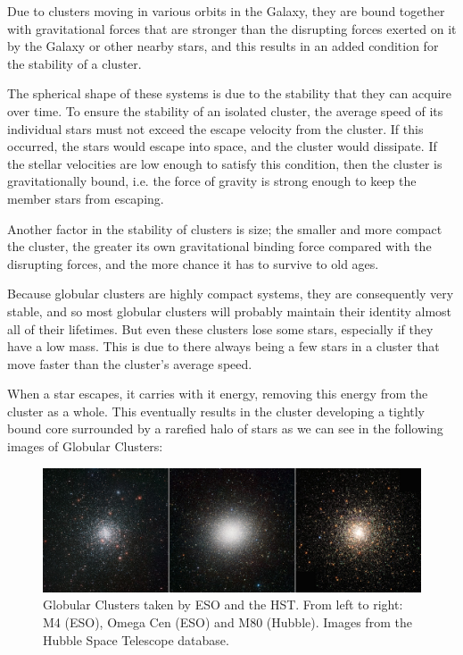 Due to clusters moving in various orbits in the Galaxy, they are bound together with gravitational forces that are stronger than the disrupting forces exerted on it by the Galaxy or other nearby stars, and this results in an added condition for the stability of a cluster.

The spherical shape of these systems is due to the stability that they can acquire over time. To ensure the stability of an isolated cluster, the average speed of its individual stars must not exceed the escape velocity from the cluster. If this occurred, the stars would escape into space, and the cluster would dissipate. If the stellar velocities are low enough to satisfy this condition, then the cluster is gravitationally bound, i.e. the force of gravity is strong enough to keep the member stars from escaping.

Another factor in the stability of clusters is size; the smaller and more compact the cluster, the greater its own gravitational binding force compared with the disrupting forces, and the more chance it has to survive to old ages.

Because globular clusters are highly compact systems, they are consequently very stable, and so most globular clusters will probably maintain their identity almost all of their lifetimes. But even these clusters lose some stars, especially if they have a low mass. This is due to there always being a few stars in a cluster that move faster than the cluster's average speed.

When a star escapes, it carries with it energy, removing this energy from the cluster as a whole. This eventually results in the cluster developing a tightly bound core surrounded by a rarefied halo of stars as we can see in the following images of Globular Clusters:

\begin{figure}[H]
\centering
\includegraphics[width=14.5cm]{images/3_gcs.png}
\caption[ESO and Hubble images of Globular Clusters]{Globular Clusters taken by ESO and the HST. From left to right: M4 (ESO), Omega Cen (ESO) and M80 (Hubble). Images from the Hubble Space Telescope database.}
\end{figure}

